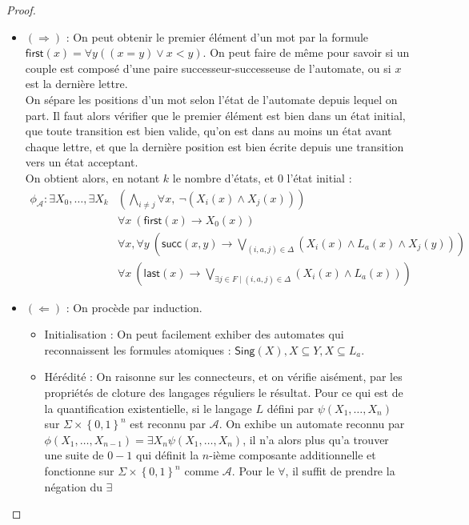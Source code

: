 \documentclass{cours}
\begin{document}
\begin{proof}
    \begin{itemize}
        \item $(\Rightarrow)$ : On peut obtenir le premier élément d'un mot par la formule $\textsf{first}(x) = \forall y ((x = y)\lor x < y)$. On peut faire de même pour savoir si un couple est composé d'une paire successeur-successeuse de l'automate, ou si $x$ est la dernière lettre.\\
        On sépare les positions d'un mot selon l'état de l'automate depuis lequel on part. Il faut alors vérifier que le premier élément est bien dans un état initial, que toute transition est bien valide, qu'on est dans au moins un état avant chaque lettre, et que la dernière position est bien écrite depuis une transition vers un état acceptant. \\
        On obtient alors, en notant $k$ le nombre d'états, et $0$ l'état initial : 
        \begin{equation}
            \begin{split}
                \phi_{\mathcal{A}} : \exists X_{0}, \ldots, \exists X_{k} & \left(\bigwedge_{i \neq j} \forall x, \ \lnot \left(X_{i}(x) \land X_{j}(x)\right)\right)\\
                & \forall x \ \left(\textsf{first}(x) \rightarrow X_{0}(x)\right)\\
                & \forall x, \forall y \ \left(\textsf{succ}(x, y) \rightarrow \bigvee_{(i, a, j) \in \Delta}\left(X_{i}(x) \land L_{a}(x) \land X_{j}(y)\right)\right)\\
                & \forall x \ \left(\textsf{last}(x) \rightarrow \bigvee_{\exists j \in F \mid (i, a, j) \in \Delta} \left(X_{i}(x) \land L_{a}(x)\right)\right)
            \end{split}
        \end{equation}
        \item $(\Leftarrow)$ : On procède par induction. 
        \begin{itemize}
            \item Initialisation : On peut facilement exhiber des automates qui reconnaissent les formules atomiques : $\textsf{Sing}(X), X \subseteq Y, X \subseteq L_{a}$.
            \item Hérédité : On raisonne sur les connecteurs, et on vérifie aisément, par les propriétés de cloture des langages réguliers le résultat. Pour ce qui est de la quantification existentielle, si le langage $L$ défini par $\psi(X_{1}, \ldots, X_{n})$ sur $\Sigma\times\left\{0, 1\right\}^{n}$ est reconnu par $\mathcal{A}$. On exhibe un automate reconnu par $\phi(X_{1}, \ldots, X_{n-1}) = \exists X_{n}\psi(X_{1}, \ldots, X_{n})$, il n'a alors plus qu'a trouver une suite de $0-1$ qui définit la $n$-ième composante additionnelle et fonctionne sur $\Sigma\times\left\{0, 1\right\}^{n}$ comme $\mathcal{A}$. Pour le $\forall$, il suffit de prendre la négation du $\exists$
        \end{itemize}
    \end{itemize}
\end{proof}
\end{document}
